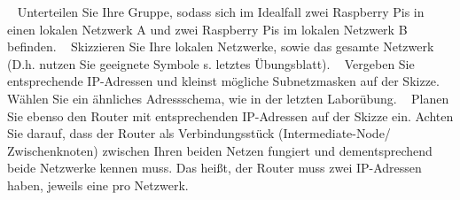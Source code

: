 \documentclass[paper=a4,fontsize=11pt]{scrartcl}%
\numberwithin{equation}{section}
\begin{document}
\begin{enumerate}
\begin{figure}[H]
	\end{figure}
	\begin{tasks}
		\task~ Unterteilen Sie Ihre Gruppe, sodass sich im Idealfall zwei Raspberry Pis in einen lokalen Netzwerk A und zwei Raspberry Pis im lokalen Netzwerk B befinden.
		\task~ Skizzieren Sie Ihre lokalen Netzwerke, sowie das gesamte Netzwerk (D.h. nutzen Sie geeignete Symbole s. letztes Übungsblatt).
		\task~ Vergeben Sie entsprechende IP-Adressen und kleinst mögliche Subnetzmasken auf der Skizze. Wählen Sie ein ähnliches Adressschema, wie in der letzten Laborübung.
		\task~ Planen Sie ebenso den Router mit entsprechenden IP-Adressen auf der Skizze ein. Achten Sie darauf, dass der Router als Verbindungsstück (Intermediate-Node/ Zwischenknoten) zwischen Ihren beiden Netzen fungiert und dementsprechend beide Netzwerke kennen muss. Das heißt, der Router muss zwei IP-Adressen haben, jeweils eine pro Netzwerk.
	\end{tasks}
\end{enumerate}
\end{document}
